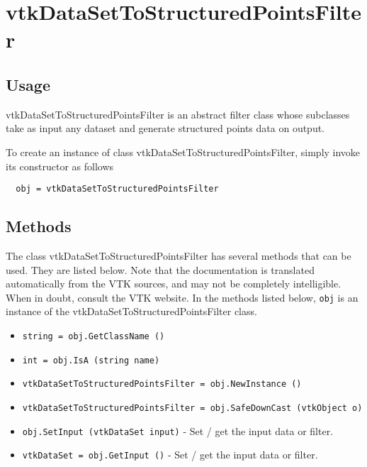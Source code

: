 \section{vtkDataSetToStructuredPointsFilter}

\subsection{Usage}

 vtkDataSetToStructuredPointsFilter is an abstract filter class whose
 subclasses take as input any dataset and generate structured points 
 data on output.

To create an instance of class vtkDataSetToStructuredPointsFilter, simply
invoke its constructor as follows
\begin{verbatim}
  obj = vtkDataSetToStructuredPointsFilter
\end{verbatim}
\subsection{Methods}

The class vtkDataSetToStructuredPointsFilter has several methods that can be used.
  They are listed below.
Note that the documentation is translated automatically from the VTK sources,
and may not be completely intelligible.  When in doubt, consult the VTK website.
In the methods listed below, \verb|obj| is an instance of the vtkDataSetToStructuredPointsFilter class.
\begin{itemize}
\item  \verb|string = obj.GetClassName ()|

\item  \verb|int = obj.IsA (string name)|

\item  \verb|vtkDataSetToStructuredPointsFilter = obj.NewInstance ()|

\item  \verb|vtkDataSetToStructuredPointsFilter = obj.SafeDownCast (vtkObject o)|

\item  \verb|obj.SetInput (vtkDataSet input)| -  Set / get the input data or filter.

\item  \verb|vtkDataSet = obj.GetInput ()| -  Set / get the input data or filter.

\end{itemize}
